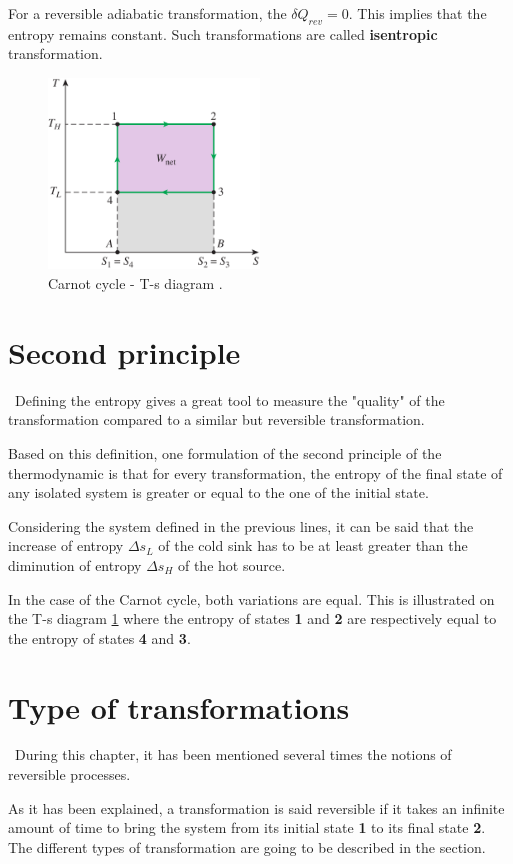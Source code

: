 For a reversible adiabatic transformation, the $\delta Q_{rev}=0$. This implies that the entropy remains constant. Such transformations are called \textbf{isentropic} transformation.
\begin{figure}[h]
\centering
\includegraphics[width=0.5\textwidth]{Carnot_TS.png}
\caption{Carnot cycle - T-s diagram \cite{2015}.}
\label{fig:C3_CarnotTS}
\end{figure}
\section{Second principle}
\quad\, Defining the entropy gives a great tool to measure the "quality" of the transformation compared to a similar but reversible transformation.

Based on this definition, one formulation of the second principle of the thermodynamic is that for every transformation, the entropy of the final state of any isolated system is greater or equal to the one of the initial state.

Considering the system defined in the previous lines, it can be said that the increase of entropy $\Delta s_L$ of the cold sink has to be at least greater than the diminution of entropy $\Delta s_H$ of the hot source.

In the case of the Carnot cycle, both variations are equal. This is illustrated on the T-s diagram \ref{fig:C3_CarnotTS} where the entropy of states \textbf{1} and \textbf{2} are respectively equal to the entropy of states \textbf{4} and \textbf{3}.
\section{Type of transformations}
\quad\ During this chapter, it has been mentioned several times the notions of reversible processes. 

As it has been explained, a transformation is said reversible if it takes an infinite amount of time to bring the system from its initial state \textbf{1} to its final state \textbf{2}. The different types of transformation are going to be described in the section.\newpage
